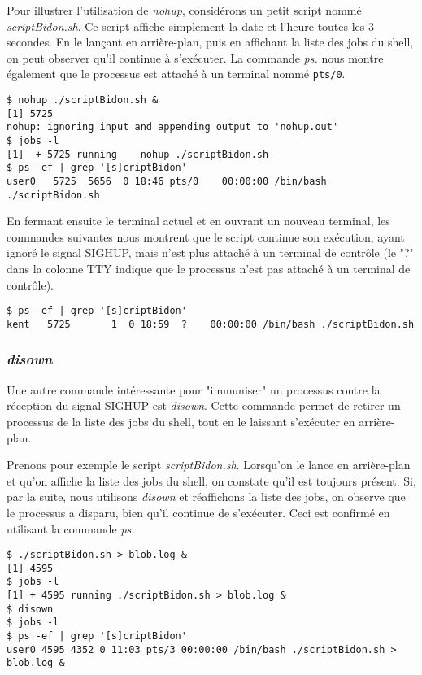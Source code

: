 Pour illustrer l'utilisation de \textit{nohup}, considérons un petit script nommé \textit{scriptBidon.sh}. Ce script affiche simplement la date et l'heure toutes les 3 secondes. En le lançant en arrière-plan, puis 
en affichant la liste des jobs du shell, on peut observer qu'il continue à s'exécuter. La commande \textit{ps.} nous montre également que le processus est attaché à un terminal nommé \texttt{pts/0}.

\begin{lstlisting}[style=blackstyle]
$ nohup ./scriptBidon.sh &
[1] 5725
nohup: ignoring input and appending output to 'nohup.out'                              
$ jobs -l
[1]  + 5725 running    nohup ./scriptBidon.sh
$ ps -ef | grep '[s]criptBidon'
user0   5725  5656  0 18:46 pts/0    00:00:00 /bin/bash ./scriptBidon.sh
\end{lstlisting}

En fermant ensuite le terminal actuel et en ouvrant un nouveau terminal, les commandes suivantes nous montrent que le script continue son exécution, ayant ignoré le signal SIGHUP,
mais n'est plus attaché à un terminal de contrôle (le "?" dans la colonne TTY indique que le processus n'est pas attaché à un terminal de contrôle).

\begin{lstlisting}[style=blackstyle]
$ ps -ef | grep '[s]criptBidon'
kent   5725       1  0 18:59  ?    00:00:00 /bin/bash ./scriptBidon.sh
\end{lstlisting}

\subsubsection{\textit{disown}}

Une autre commande intéressante pour "immuniser" un processus contre la réception du signal SIGHUP est \textit{disown}. Cette commande permet de retirer un processus de la liste des jobs du shell,
tout en le laissant s'exécuter en arrière-plan.

Prenons pour exemple le script \textit{scriptBidon.sh}. Lorsqu'on le lance en arrière-plan et qu'on affiche la liste des jobs du shell, on constate qu'il est toujours présent. Si, par la suite,
nous utilisons \textit{disown} et réaffichons la liste des jobs, on observe que le processus a disparu, bien qu'il continue de s'exécuter. Ceci est confirmé en utilisant la commande \textit{ps}.

\begin{lstlisting}[style=blackstyle]
$ ./scriptBidon.sh > blob.log &
[1] 4595
$ jobs -l
[1] + 4595 running ./scriptBidon.sh > blob.log &
$ disown
$ jobs -l
$ ps -ef | grep '[s]criptBidon'
user0 4595 4352 0 11:03 pts/3 00:00:00 /bin/bash ./scriptBidon.sh > blob.log &
\end{lstlisting}


